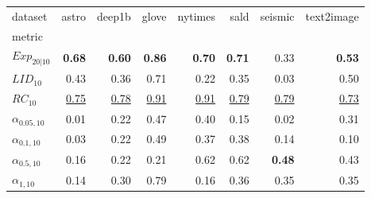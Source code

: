\begin{tabular}{lrrrrrrr}
dataset & astro & deep1b & glove & nytimes & sald & seismic & text2image \\
metric &  &  &  &  &  &  &  \\
$Exp_{20|10}$ & \textbf{0.68} & \textbf{0.60} & \textbf{0.86} & \textbf{0.70} & \textbf{0.71} & 0.33 & \textbf{0.53} \\
$LID_{10}$ & 0.43 & 0.36 & 0.71 & 0.22 & 0.35 & 0.03 & 0.50 \\
$RC_{10}$ & \underline{0.75} & \underline{0.78} & \underline{0.91} & \underline{0.91} & \underline{0.79} & \underline{0.79} & \underline{0.73} \\
$\alpha_{0.05, 10}$ & 0.01 & 0.22 & 0.47 & 0.40 & 0.15 & 0.02 & 0.31 \\
$\alpha_{0.1, 10}$ & 0.03 & 0.22 & 0.49 & 0.37 & 0.38 & 0.14 & 0.10 \\
$\alpha_{0.5, 10}$ & 0.16 & 0.22 & 0.21 & 0.62 & 0.62 & \textbf{0.48} & 0.43 \\
$\alpha_{1, 10}$ & 0.14 & 0.30 & 0.79 & 0.16 & 0.36 & 0.35 & 0.35 \\
\end{tabular}

